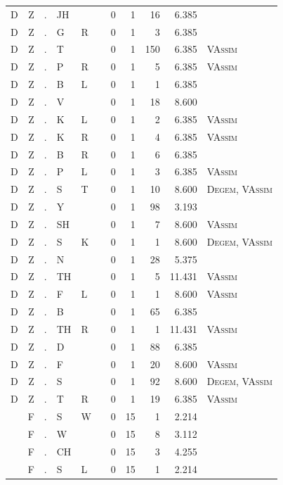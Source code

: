 \documentclass[12pt]{article}
\begin{document}
\begin{longtable}{r@{ } r@{ } c@{ } l@{ } l@{ } l@{ } r r r r l }
D & Z & . & JH &  &  & 0 & 1 & 16 & 6.385 &  \\
D & Z & . & G & R &  & 0 & 1 & 3 & 6.385 &  \\
D & Z & . & T &  &  & 0 & 1 & 150 & 6.385 & \textsc{VAssim} \\
D & Z & . & P & R &  & 0 & 1 & 5 & 6.385 & \textsc{VAssim} \\
D & Z & . & B & L &  & 0 & 1 & 1 & 6.385 &  \\
D & Z & . & V &  &  & 0 & 1 & 18 & 8.600 &  \\
D & Z & . & K & L &  & 0 & 1 & 2 & 6.385 & \textsc{VAssim} \\
D & Z & . & K & R &  & 0 & 1 & 4 & 6.385 & \textsc{VAssim} \\
D & Z & . & B & R &  & 0 & 1 & 6 & 6.385 &  \\
D & Z & . & P & L &  & 0 & 1 & 3 & 6.385 & \textsc{VAssim} \\
D & Z & . & S & T &  & 0 & 1 & 10 & 8.600 & \textsc{Degem}, \textsc{VAssim} \\
D & Z & . & Y &  &  & 0 & 1 & 98 & 3.193 &  \\
D & Z & . & SH &  &  & 0 & 1 & 7 & 8.600 & \textsc{VAssim} \\
D & Z & . & S & K &  & 0 & 1 & 1 & 8.600 & \textsc{Degem}, \textsc{VAssim} \\
D & Z & . & N &  &  & 0 & 1 & 28 & 5.375 &  \\
D & Z & . & TH &  &  & 0 & 1 & 5 & 11.431 & \textsc{VAssim} \\
D & Z & . & F & L &  & 0 & 1 & 1 & 8.600 & \textsc{VAssim} \\
D & Z & . & B &  &  & 0 & 1 & 65 & 6.385 &  \\
D & Z & . & TH & R &  & 0 & 1 & 1 & 11.431 & \textsc{VAssim} \\
D & Z & . & D &  &  & 0 & 1 & 88 & 6.385 &  \\
D & Z & . & F &  &  & 0 & 1 & 20 & 8.600 & \textsc{VAssim} \\
D & Z & . & S &  &  & 0 & 1 & 92 & 8.600 & \textsc{Degem}, \textsc{VAssim} \\
D & Z & . & T & R &  & 0 & 1 & 19 & 6.385 & \textsc{VAssim} \\
 & F & . & S & W &  & 0 & 15 & 1 & 2.214 &  \\
 & F & . & W &  &  & 0 & 15 & 8 & 3.112 &  \\
 & F & . & CH &  &  & 0 & 15 & 3 & 4.255 &  \\
 & F & . & S & L &  & 0 & 15 & 1 & 2.214 &  \\

\end{longtable}
\end{document}
